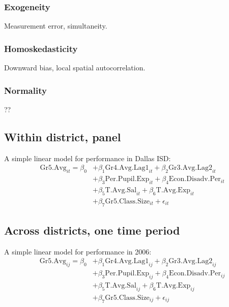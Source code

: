 \documentclass[11pt]{article}
\begin{document}
\subsubsection{Exogeneity}

Measurement error, simultaneity.

\subsubsection{Homoskedasticity}

Downward bias, local spatial autocorrelation. 


\subsubsection{Normality}

??
  
  \subsection{Within district, panel}
\label{ss:nextsub2}

A simple linear model for performance in Dallas ISD:
  \begin{align*}
\mathrm{Gr5.Avg}_{it} = \beta_{0} 
&+ \beta_{1}  \mathrm{Gr4.Avg.Lag1}_{it} 
+ \beta_{2}  \mathrm{Gr3.Avg.Lag2}_{it}    \\
&+ \beta_{3}  \mathrm{Per.Pupil.Exp}_{it} 
+ \beta_{4}  \mathrm{Econ.Disadv.Per}_{it} \\
&+ \beta_{5}  \mathrm{T.Avg.Sal}_{it}   
+ \beta_{6}  \mathrm{T.Avg.Exp}_{it}  \\
&+ \beta_{7}  \mathrm{Gr5.Class.Size}_{it} + \epsilon_{it}
\end{align*}

\subsection{Across districts, one time period}
\label{ss:nextsub3}

A simple linear model for performance in 2006:
  \begin{align*}
\mathrm{Gr5.Avg}_{ij} = \beta_{0} 
&+ \beta_{1}  \mathrm{Gr4.Avg.Lag1}_{ij} 
+ \beta_{2}  \mathrm{Gr3.Avg.Lag2}_{ij}    \\
&+ \beta_{3}  \mathrm{Per.Pupil.Exp}_{ij} 
+ \beta_{4}  \mathrm{Econ.Disadv.Per}_{ij} \\
&+ \beta_{5}  \mathrm{T.Avg.Sal}_{ij}   
+ \beta_{6}  \mathrm{T.Avg.Exp}_{ij}  \\
&+ \beta_{7}  \mathrm{Gr5.Class.Size}_{ij} + \epsilon_{ij}
\end{align*}
\end{document}
